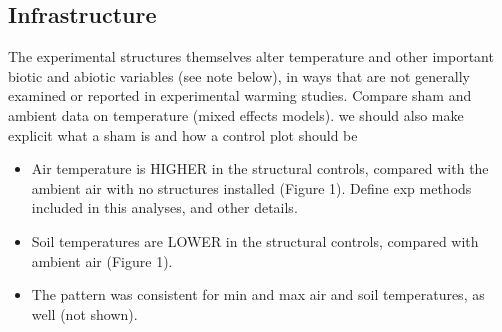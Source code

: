 \documentclass{article}
\begin{document}
\subsection {Infrastructure}
The experimental structures themselves alter temperature and other important biotic and abiotic variables (see note below), in ways that are not generally examined or reported in experimental warming studies. Compare sham and ambient data on temperature (mixed effects models). we should also make explicit what a sham is and how a control plot should be%
\begin{itemize}
\item Air temperature is HIGHER in the structural controls, compared with the ambient air with no structures installed (Figure 1). Define exp methods included in this analyses, and other details.
\item Soil temperatures are LOWER in the structural controls, compared with ambient air  (Figure 1). 
\item The pattern was consistent for min and max air and soil temperatures, as well (not shown).


\end{itemize}
\end{document}

